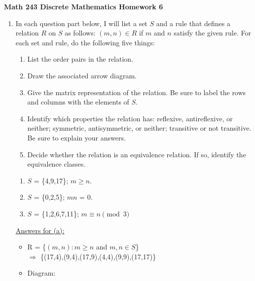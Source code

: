 \documentclass{article}
\begin{document}
\noindent\textbf{Math 243 Discrete Mathematics \hfill Homework 6}

\begin{enumerate}
    \item In each question part below, I will list a set $\mathit{S}$ and 
    a rule that defines a relation $\mathit{R}$ on $\mathit{S}$ as follows: 
    $(\mathit{m,n}) \in R$ if $\mathit{m}$ and $\mathit{n}$ satisfy the given rule. 
    For each set and rule, do the following five things: 
\begin{enumerate}[label=\bfseries \roman*]
\item List the order pairs in the relation.
\item Draw the associated arrow diagram.
\item Give the matrix representation of the relation. 
Be sure to label the rows and columns with the elements of $S$.
\item Identify which properties the relation has: reflexive, 
antireflexive, or neither; symmetric, antisymmetric, or neither; 
transitive or not transitive. Be sure to explain your answers.
\item Decide whether the relation is an equivalence relation. 
If so, identify the equivalence classes.     
\end{enumerate}

\begin{enumerate}
    \item $\mathit{S}$ = \{4,9,17\}; $m \geq n$.    
    \item $\mathit{S}$ = \{0,2,5\}; $mn$ = 0.
    \item $\mathit{S}$ = \{1,2,6,7,11\}; $m \equiv n \pmod{3}$
\end{enumerate}

\underline{Answers for (a):}    

\begin{itemize}
    \item R = \{$(m,n):m \geq n$ and $m,n \in S$\}
    \\$\Rightarrow$ \{(17,4),(9,4),(17,9),(4,4),(9,9),(17,17)\}\\

    \item Diagram:\\


\end{itemize}
\end{enumerate}
\end{document}
